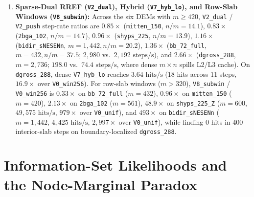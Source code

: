 \documentclass[12pt]{article}
\theoremstyle{definition}
\newcommand{\ttt}[1]{\texttt{#1}}
\begin{document}
\begin{enumerate}[label=(\arabic*)]
    $2.79\times$--$20.24\times$ (and \ttt{V0\_unif} by $2.62\times$--$405.2\times$ on the nine runs with uniform
    hits). Because \ttt{hits/s} counts intra-step candidate multiplicities, Table~\ref{tab:bench_detail} also reports
    \ttt{hit\_st}: on \ttt{bb\_72\_simp} ($l = 0$), \ttt{V4\_cnt\_uni} raises per-step hit probability
    $P_{\mathrm{step}}$ from $8.9\%$ ($355/4{,}000$, expected wall-clock time to first hit $\mathrm{TTF} =
    0.37\text{ ms}$) to $40.8\%$ ($1{,}632/4{,}000$, $\mathrm{TTF} = 0.081\text{ ms}$, a $4.6\times$ reduction in
    $\mathrm{TTF}$), and on \ttt{shyps\_225\_Z}, \ttt{V6\_cnt\_win} raises $P_{\mathrm{step}}$ from $1.37\%$
    (\ttt{V0\_unif}, $\mathrm{TTF} = 20.7\text{ ms}$) and $20.2\%$ (\ttt{V0\_win256}, $\mathrm{TTF} = 1.45\text{
    ms}$) to $67.8\%$ ($\mathrm{TTF} = 0.43\text{ ms}$) while increasing \ttt{uniq} from $721$ to $2{,}404$.
  \item \textbf{Sparse-Dual RREF (\ttt{V2\_dual}), Hybrid (\ttt{V7\_hyb\_lo}), and Row-Slab Windows
    (\ttt{V8\_subwin}):} Across the six DEMs with $m \ge 420$, \ttt{V2\_dual} / \ttt{V2\_push} step-rate ratios are
    $0.85\times$ (\ttt{mitten\_150}, $n/m = 14.1$), $0.83\times$ (\ttt{2bga\_102}, $n/m = 14.7$), $0.96\times$
    (\ttt{shyps\_225}, $n/m = 13.9$), $1.16\times$ (\ttt{bidir\_sNESENn}, $m = 1{,}442, n/m = 20.2$), $1.36\times$
    (\ttt{bb\_72\_full}, $m = 432, n/m = 37.5$; $2{,}980$ vs.\ $2{,}192\text{ steps/s}$), and $2.66\times$
    (\ttt{dgross\_288}, $m = 2{,}736$; $198.0$ vs.\ $74.4\text{ steps/s}$, where dense $m \times n$ spills L2/L3
    cache). On \ttt{dgross\_288}, dense \ttt{V7\_hyb\_lo}
    reaches $3.64\text{ hits/s}$ ($18$ hits across $11$ steps, $16.9\times$ over \ttt{V0\_win256}). For row-slab
    windows ($m > 320$), \ttt{V8\_subwin} / \ttt{V0\_win256} is $0.33\times$ on \ttt{bb\_72\_full} ($m = 432$),
    $0.96\times$ on \ttt{mitten\_150} ($m = 420$), $2.13\times$ on \ttt{2bga\_102} ($m = 561$), $48.9\times$ on
    \ttt{shyps\_225\_Z} ($m = 600$, $49{,}575\text{ hits/s}$, $979\times$ over \ttt{V0\_unif}), and $493\times$ on
    \ttt{bidir\_sNESENn} ($m = 1{,}442$, $4{,}425\text{ hits/s}$, $2{,}997\times$ over \ttt{V0\_unif}), while finding
    $0$ hits in $400$ interior-slab steps on boundary-localized \ttt{dgross\_288}.
\end{enumerate}

\section{Information-Set Likelihoods and the Node-Marginal Paradox}\label{sec:infosets}
\end{document}
